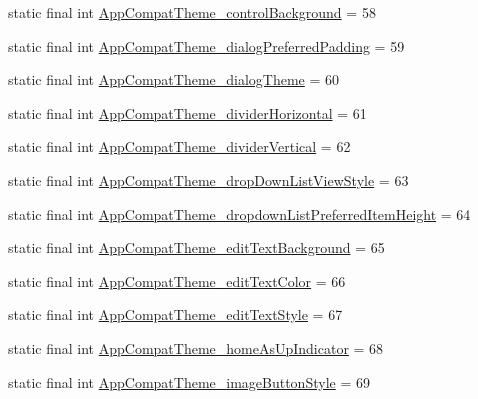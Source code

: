 \begin{DoxyCompactItemize}
\item 
static final int \mbox{\hyperlink{classandroid_1_1support_1_1v7_1_1appcompat_1_1R_1_1styleable_a1459b42a4639cb7d3dee1500ad41f746}{App\+Compat\+Theme\+\_\+control\+Background}} = 58
\item 
static final int \mbox{\hyperlink{classandroid_1_1support_1_1v7_1_1appcompat_1_1R_1_1styleable_ac445010ed6737b533f69751345cdacae}{App\+Compat\+Theme\+\_\+dialog\+Preferred\+Padding}} = 59
\item 
static final int \mbox{\hyperlink{classandroid_1_1support_1_1v7_1_1appcompat_1_1R_1_1styleable_a811594124b056b626c7b3d35fe15c677}{App\+Compat\+Theme\+\_\+dialog\+Theme}} = 60
\item 
static final int \mbox{\hyperlink{classandroid_1_1support_1_1v7_1_1appcompat_1_1R_1_1styleable_a98c967784babb8cbb86221b389f89c3d}{App\+Compat\+Theme\+\_\+divider\+Horizontal}} = 61
\item 
static final int \mbox{\hyperlink{classandroid_1_1support_1_1v7_1_1appcompat_1_1R_1_1styleable_ace844d1c08d362d3e5c62f868ed46745}{App\+Compat\+Theme\+\_\+divider\+Vertical}} = 62
\item 
static final int \mbox{\hyperlink{classandroid_1_1support_1_1v7_1_1appcompat_1_1R_1_1styleable_a2b86f5562d51fef86c35b13b2af3e180}{App\+Compat\+Theme\+\_\+drop\+Down\+List\+View\+Style}} = 63
\item 
static final int \mbox{\hyperlink{classandroid_1_1support_1_1v7_1_1appcompat_1_1R_1_1styleable_adaed150cfd7b0ea3df5b4060d6e26849}{App\+Compat\+Theme\+\_\+dropdown\+List\+Preferred\+Item\+Height}} = 64
\item 
static final int \mbox{\hyperlink{classandroid_1_1support_1_1v7_1_1appcompat_1_1R_1_1styleable_a0cafc06f0b9093a2445c09f136a53d76}{App\+Compat\+Theme\+\_\+edit\+Text\+Background}} = 65
\item 
static final int \mbox{\hyperlink{classandroid_1_1support_1_1v7_1_1appcompat_1_1R_1_1styleable_a2de00e4c9241f547b3d4be6b640aba1b}{App\+Compat\+Theme\+\_\+edit\+Text\+Color}} = 66
\item 
static final int \mbox{\hyperlink{classandroid_1_1support_1_1v7_1_1appcompat_1_1R_1_1styleable_a9ef732de87aea4df4b38e197f02c4b88}{App\+Compat\+Theme\+\_\+edit\+Text\+Style}} = 67
\item 
static final int \mbox{\hyperlink{classandroid_1_1support_1_1v7_1_1appcompat_1_1R_1_1styleable_abae608ec756d9a4d7cf7670ef6cfe4c6}{App\+Compat\+Theme\+\_\+home\+As\+Up\+Indicator}} = 68
\item 
static final int \mbox{\hyperlink{classandroid_1_1support_1_1v7_1_1appcompat_1_1R_1_1styleable_a98ddc290b2241001d5640b6cd997eab4}{App\+Compat\+Theme\+\_\+image\+Button\+Style}} = 69

\end{DoxyCompactItemize}
